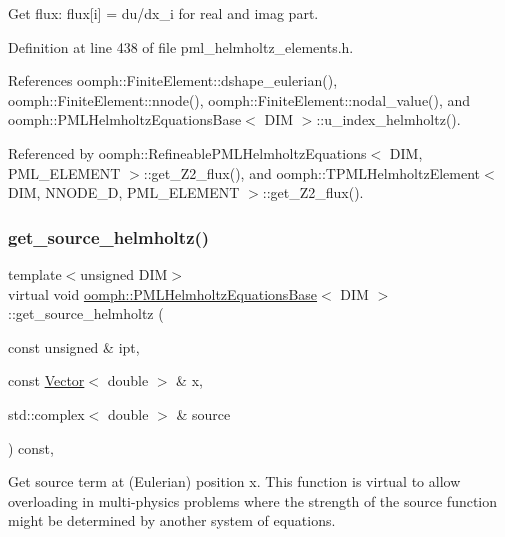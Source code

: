 Get flux\+: flux\mbox{[}i\mbox{]} = du/dx\+\_\+i for real and imag part. 



Definition at line 438 of file pml\+\_\+helmholtz\+\_\+elements.\+h.



References oomph\+::\+Finite\+Element\+::dshape\+\_\+eulerian(), oomph\+::\+Finite\+Element\+::nnode(), oomph\+::\+Finite\+Element\+::nodal\+\_\+value(), and oomph\+::\+P\+M\+L\+Helmholtz\+Equations\+Base$<$ D\+I\+M $>$\+::u\+\_\+index\+\_\+helmholtz().



Referenced by oomph\+::\+Refineable\+P\+M\+L\+Helmholtz\+Equations$<$ D\+I\+M, P\+M\+L\+\_\+\+E\+L\+E\+M\+E\+N\+T $>$\+::get\+\_\+\+Z2\+\_\+flux(), and oomph\+::\+T\+P\+M\+L\+Helmholtz\+Element$<$ D\+I\+M, N\+N\+O\+D\+E\+\_\+D, P\+M\+L\+\_\+\+E\+L\+E\+M\+E\+N\+T $>$\+::get\+\_\+\+Z2\+\_\+flux().

\mbox{\label{classoomph_1_1PMLHelmholtzEquationsBase_adc5a0db474b2a7a857e2d5724f5293f5}} 
\subsubsection{\texorpdfstring{get\+\_\+source\+\_\+helmholtz()}{get\_source\_helmholtz()}}
{\footnotesize\ttfamily template$<$unsigned D\+IM$>$ \\
virtual void \hyperlink{classoomph_1_1PMLHelmholtzEquationsBase}{oomph\+::\+P\+M\+L\+Helmholtz\+Equations\+Base}$<$ D\+IM $>$\+::get\+\_\+source\+\_\+helmholtz (\begin{DoxyParamCaption}\item[{const unsigned \&}]{ipt,  }\item[{const \hyperlink{classoomph_1_1Vector}{Vector}$<$ double $>$ \&}]{x,  }\item[{std\+::complex$<$ double $>$ \&}]{source }\end{DoxyParamCaption}) const\hspace{0.3cm}{\ttfamily [inline]}, {\ttfamily [virtual]}}

Get source term at (Eulerian) position x. This function is virtual to allow overloading in multi-\/physics problems where the strength of the source function might be determined by another system of equations. 

